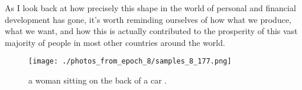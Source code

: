 \documentclass{article}%
\begin{document}
As I look back at how precisely this shape in the world of personal and financial development has gone, it's worth reminding ourselves of how what we produce, what we want, and how this is actually contributed to the prosperity of this vast majority of people in most other countries around the world.\newline%

%


\begin{figure}[h!]%
\centering%
\texttt{[image: ./photos\_from\_epoch\_8/samples\_8\_177.png]}%
\caption{a woman sitting on the back of a car .}%
\end{figure}

%
\end{document}
